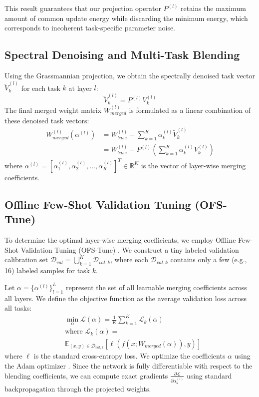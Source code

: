 This result guarantees that our projection operator $P^{(l)}$ retains the maximum amount of common update energy while discarding the minimum energy, which corresponds to incoherent task-specific parameter noise.

\subsection{Spectral Denoising and Multi-Task Blending}
Using the Grassmannian projection, we obtain the spectrally denoised task vector $\tilde{V}_k^{(l)}$ for each task $k$ at layer $l$:
\begin{equation}
    \tilde{V}_k^{(l)} = P^{(l)} V_k^{(l)}
\end{equation}
The final merged weight matrix $W_{merged}^{(l)}$ is formulated as a linear combination of these denoised task vectors:
\begin{equation}
\begin{split}
    W_{merged}^{(l)}(\alpha^{(l)}) &= W_{base}^{(l)} + \sum_{k=1}^K \alpha_k^{(l)} \tilde{V}_k^{(l)} \\
    &= W_{base}^{(l)} + P^{(l)} \left( \sum_{k=1}^K \alpha_k^{(l)} V_k^{(l)} \right)
\end{split}
\end{equation}
where $\alpha^{(l)} = [\alpha_1^{(l)}, \alpha_2^{(l)}, \dots, \alpha_K^{(l)}]^T \in \mathbb{R}^K$ is the vector of layer-wise merging coefficients.

\subsection{Offline Few-Shot Validation Tuning (OFS-Tune)}
To determine the optimal layer-wise merging coefficients, we employ Offline Few-Shot Validation Tuning (OFS-Tune) \cite{ofstune}. We construct a tiny labeled validation calibration set $\mathcal{D}_{val} = \bigcup_{k=1}^K \mathcal{D}_{val, k}$, where each $\mathcal{D}_{val, k}$ contains only a few (e.g., 16) labeled samples for task $k$.

Let $\alpha = \{\alpha^{(l)}\}_{l=1}^L$ represent the set of all learnable merging coefficients across all layers. We define the objective function as the average validation loss across all tasks:
\begin{equation}
\begin{split}
    &\min_{\alpha} \mathcal{L}(\alpha) = \frac{1}{K} \sum_{k=1}^K \mathcal{L}_k(\alpha) \\
    &\text{where } \mathcal{L}_k(\alpha) = \\
    &\mathbb{E}_{(x, y) \in \mathcal{D}_{val, k}} \left[ \ell\left(f(x; W_{merged}(\alpha)), y\right) \right]
\end{split}
\end{equation}
where $\ell$ is the standard cross-entropy loss. We optimize the coefficients $\alpha$ using the Adam optimizer \cite{kingma2014adam}. Since the network is fully differentiable with respect to the blending coefficients, we can compute exact gradients $\frac{\partial \mathcal{L}}{\partial \alpha_k^{(l)}}$ using standard backpropagation through the projected weights.

